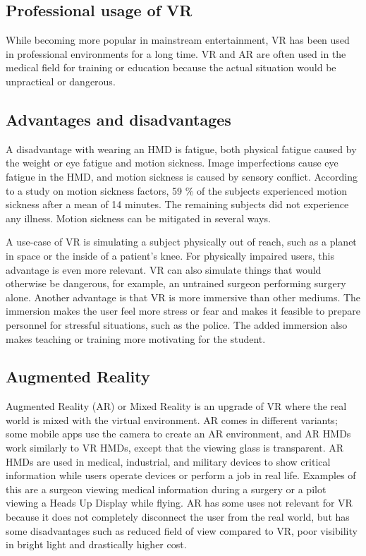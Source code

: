 \documentclass[a4paper]{report}
\begin{document}
\subsection{Professional usage of VR}
While becoming more popular in mainstream entertainment, VR has been used in professional environments for a long time\cite{needed}. VR and AR are often used in the medical field for training or education because the actual situation would be unpractical or dangerous\cite{freina_immersive_2015}.

\subsection{Advantages and disadvantages}
A disadvantage with wearing an HMD is fatigue, both physical fatigue caused by the weight or eye fatigue and motion sickness\cite{merhi_motion_2007}.
Image imperfections cause eye fatigue in the HMD\cite{kooi_visual_2004}, and motion sickness is caused by sensory conflict.
According to a study on motion sickness factors, 59 \% of the subjects experienced motion sickness after a mean of 14 minutes. The remaining subjects did not experience any illness\cite{kooi_visual_2004}. Motion sickness can be mitigated in several ways.


A use-case of VR is simulating a subject physically out of reach, such as a planet in space or the inside of a patient's knee. For physically impaired users, this advantage is even more relevant.
VR can also simulate things that would otherwise be dangerous, for example, an untrained surgeon performing surgery alone.
Another advantage is that VR is more immersive than other mediums. The immersion makes the user feel more stress or fear and makes it feasible to prepare personnel for stressful situations, such as the police.
The added immersion also makes teaching or training more motivating for the student.\cite{freina_immersive_2015}

\subsection{ Augmented Reality }
Augmented Reality (AR) or Mixed Reality is an upgrade of VR where the real world is mixed with the virtual environment\cite{hackett_three-dimensional_2016}. AR comes in different variants; some mobile apps use the camera to create an AR environment, and AR HMDs work similarly to VR HMDs, except that the viewing glass is transparent.
AR HMDs are used in medical, industrial, and military devices to show critical information while users operate devices or perform a job in real life. Examples of this are a surgeon viewing medical information during a surgery or a pilot viewing a Heads Up Display while flying\cite{mihelj_virtual_2014}.
AR has some uses not relevant for VR because it does not completely disconnect the user from the real world, but has some disadvantages such as reduced field of view compared to VR, poor visibility in bright light\cite{hackett_three-dimensional_2016} and drastically higher cost\cite{medical_holodeck_medicalholodeck_nodate}.
\end{document}
